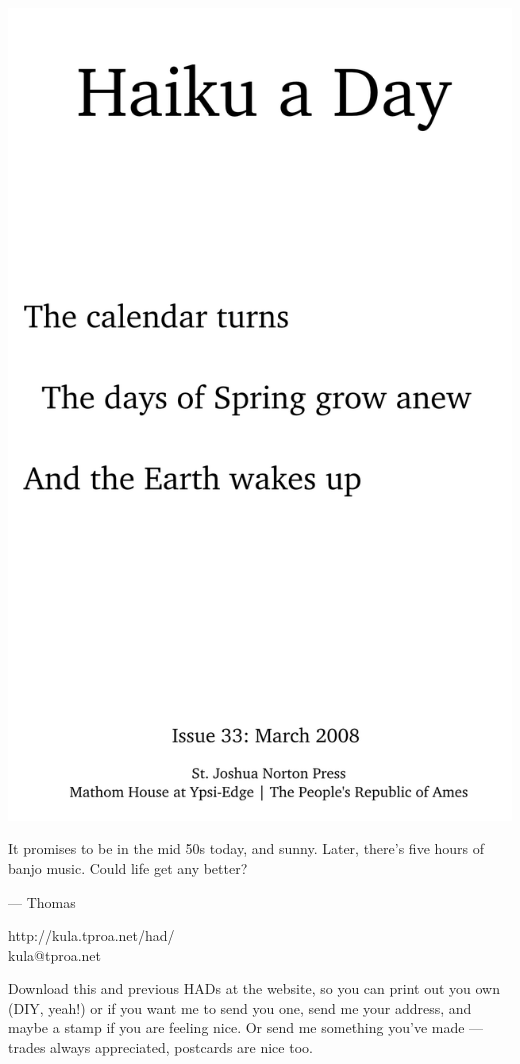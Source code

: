 \documentclass[12pt]{article}
\begin{document}
\includegraphics{frontpage.png}

\newpage

It promises to be in the mid 50s today, and sunny. Later,
there's five hours of banjo music. Could life get any 
better?

--- Thomas

http://kula.tproa.net/had/ \\
kula@tproa.net

Download this and previous HADs at the website, so you can
print out you own (DIY, yeah!) or if you want me to send
you one, send me your address, and maybe a stamp if you
are feeling nice. Or send me something you've made ---
trades always appreciated, postcards are nice too.
\end{document}
